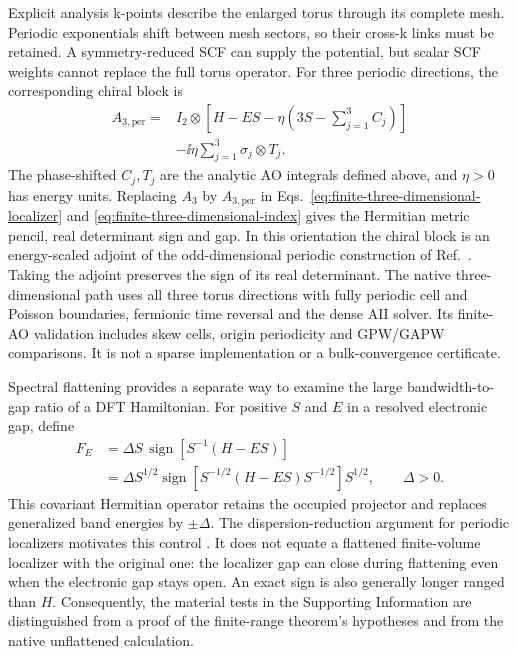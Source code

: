 Explicit analysis k-points describe the enlarged torus through its
complete mesh. Periodic exponentials shift between mesh sectors,
so their cross-k links must be retained.
A symmetry-reduced SCF can supply the potential, but scalar SCF
weights cannot replace the full torus operator.
For three periodic directions, the corresponding chiral block is
\begin{equation}
 \begin{split}
 A_{3,\mathrm{per}}={}&I_2\otimes
   \left[H-ES-\eta\left(3S-\sum_{j=1}^3C_j\right)\right]\\
 &-\ii\eta\sum_{j=1}^3\sigma_j\otimes T_j .
 \end{split}
 \label{eq:periodic-three-dimensional-localizer}
\end{equation}
The phase-shifted $C_j,T_j$ are the analytic AO integrals defined
above, and $\eta>0$ has energy units. Replacing $A_3$ by
$A_{3,\mathrm{per}}$ in Eqs.~\eqref{eq:finite-three-dimensional-localizer}
and \eqref{eq:finite-three-dimensional-index} gives the Hermitian
metric pencil, real determinant sign and gap. In this orientation
the chiral block is an energy-scaled adjoint of the odd-dimensional
periodic construction of Ref.~\cite{Doll2025}. Taking the adjoint
preserves the sign of its real determinant.
The native three-dimensional path uses all three torus directions
with fully periodic cell and Poisson boundaries, fermionic time
reversal and the dense AII solver. Its finite-AO validation includes
skew cells, origin periodicity and GPW/GAPW comparisons. It is not
a sparse implementation or a bulk-convergence certificate.

Spectral flattening provides a separate way to examine the large
bandwidth-to-gap ratio of a DFT Hamiltonian. For positive $S$ and
$E$ in a resolved electronic gap, define
\begin{equation}
 \begin{aligned}
 F_E&=\Delta S\,\operatorname{sign}\!\left[S^{-1}(H-ES)\right]\\
 &=\Delta S^{1/2}\operatorname{sign}\!\left[S^{-1/2}(H-ES)S^{-1/2}\right]S^{1/2},
 \qquad \Delta>0 .
 \end{aligned}
 \label{eq:covariant-flattening}
\end{equation}
This covariant Hermitian operator retains the occupied projector
and replaces generalized band energies by $\pm\Delta$.
The dispersion-reduction argument for periodic localizers motivates
this control \cite{Doll2025}. It does not equate a flattened
finite-volume localizer with the original one: the localizer gap
can close during flattening even when the electronic gap stays open.
An exact sign is also generally longer ranged than $H$.
Consequently, the material tests in the Supporting Information
are distinguished from a proof of the finite-range theorem's
hypotheses and from the native unflattened calculation.


